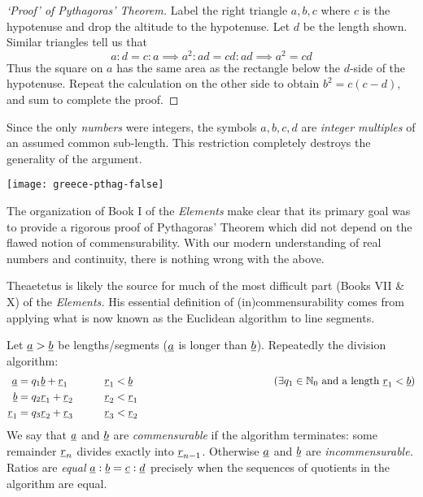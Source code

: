 \begin{minipage}[t]{0.67\linewidth}\vspace{0pt}
	\begin{proof}[`Proof' of Pythagoras' Theorem]\label{pg:pythwrong}
		Label the right triangle $a,b,c$ where $c$ is the hypotenuse and drop the altitude to the hypotenuse. Let $d$ be the length shown. Similar triangles tell us that
		\[
			a:d=c:a\implies a^2:ad=cd:ad\implies a^2=cd
		\]
		Thus the square on $a$ has the same area as the rectangle below the $d$-side of the hypotenuse. Repeat the calculation on the other side to obtain $b^2=c(c-d)$, and sum to complete the proof.
	\end{proof}

	Since the only \emph{numbers} were integers, the symbols $a,b,c,d$ are \emph{integer multiples} of an assumed common sub-length. This restriction completely destroys the generality of the argument.
\end{minipage}
\hfill
\begin{minipage}[t]{0.32\linewidth}\vspace{0pt}
	\flushright
	\texttt{[image: greece-pthag-false]}\label{pthagorig}
\end{minipage}
\smallbreak

The organization of Book I of the \emph{Elements} make clear that its primary goal was to provide a rigorous proof of Pythagoras' Theorem which did not depend on the flawed notion of commensurability. With our modern understanding of real numbers and continuity, there is nothing wrong with the above.%




\def\ul{\underline}

Theaetetus is likely the source for much of the most difficult part (Books VII \& X) of the \emph{Elements.} His essential definition of (in)commensurability comes from applying what is now known as the Euclidean algorithm to line segments. 

\begin{defn*}{}{}
	Let $\ul a>\ul b$ be lengths/segments\footnotemark{} ($\ul a$ is longer than $\ul b$). Repeatedly the division algorithm: 
	\begin{align*}
		\ul a&=q_1\ul b+\ul r_1\qquad &&\ul r_1<\ul b&&\hspace*{100pt}\tag{$\exists q_1\in\N_0$ and a length $\ul r_1<\ul b$}\\
		\ul b&=q_2\ul r_1+\ul r_2\qquad &&\ul r_2<\ul r_1\\
		\ul r_1&=q_3\ul r_2+\ul r_3\qquad &&\ul r_3<\ul r_2
	\end{align*}
	We say that $\ul a$ and $\ul b$ are \emph{commensurable} if the algorithm terminates: some remainder $\ul r_n$ divides exactly into $\ul r_{n-1}$. Otherwise $\ul a$ and $\ul b$ are \emph{incommensurable.}\smallbreak
	Ratios are \emph{equal} $\ul a:\ul b=\ul c:\ul d$ precisely when the sequences of quotients in the algorithm are equal.
\end{defn*}

